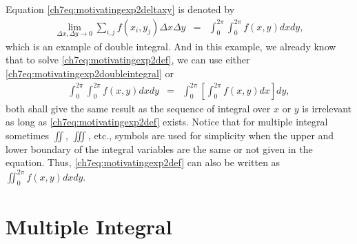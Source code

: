 Equation \eqref{ch7eq:motivatingexp2deltaxy} is denoted by
\begin{eqnarray}
  \lim_{\Delta x, \Delta y \rightarrow 0} \sum_{i,j} f(x_i,y_j) \Delta x \Delta y &=& \int_{0}^{2\pi}\int_{0}^{2\pi} f(x,y) dx dy ,\label{ch7eq:motivatingexp2def}
\end{eqnarray}
which is an example of double integral. And in this example, we already know that to solve \eqref{ch7eq:motivatingexp2def}, we can use either \eqref{ch7eq:motivatingexp2doubleintegral} or
\begin{eqnarray}
  \int_{0}^{2\pi}\int_{0}^{2\pi} f(x,y) dx dy &=& \int_{0}^{2\pi} \left[\int_{0}^{2\pi}f(x,y)dx\right]dy, \nonumber
\end{eqnarray}
both shall give the same result as the sequence of integral over $x$ or $y$ is irrelevant as long as \eqref{ch7eq:motivatingexp2def} exists. Notice that for multiple integral sometimes $\iint$, $\iiint$, etc., symbols are used for simplicity when the upper and lower boundary of the integral variables are the same or not given in the equation. Thus, \eqref{ch7eq:motivatingexp2def} can also be written as $\iint_{0}^{2\pi} f(x,y)dx dy$.

\section{Multiple Integral} \label{ch7sec:multipleintegral}

